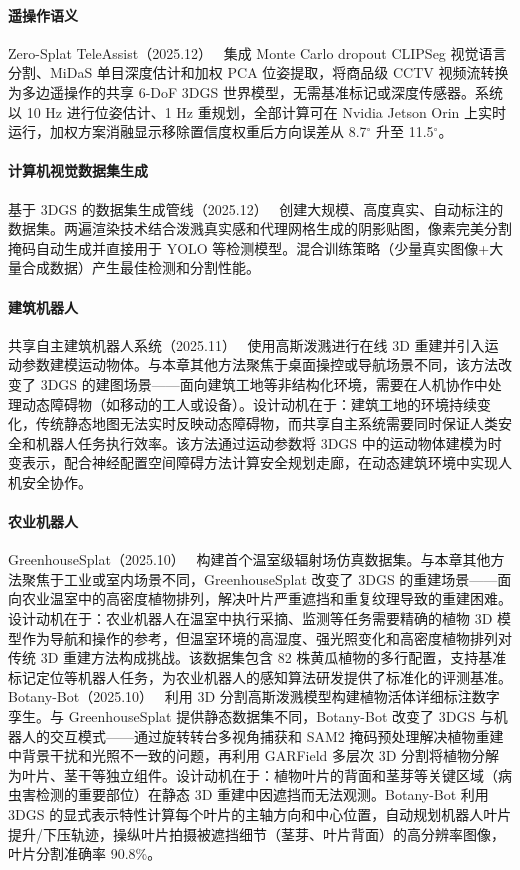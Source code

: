 \paragraph{遥操作语义}

Zero-Splat TeleAssist（2025.12）~\cite{2512_08271} 集成 Monte Carlo dropout CLIPSeg 视觉语言分割、MiDaS 单目深度估计和加权 PCA 位姿提取，将商品级 CCTV 视频流转换为多边遥操作的共享 6-DoF 3DGS 世界模型，无需基准标记或深度传感器。系统以 10 Hz 进行位姿估计、1 Hz 重规划，全部计算可在 Nvidia Jetson Orin 上实时运行，加权方案消融显示移除置信度权重后方向误差从 8.7$^\circ$ 升至 11.5$^\circ$。

\paragraph{计算机视觉数据集生成}

基于 3DGS 的数据集生成管线（2025.12）~\cite{2512_13411} 创建大规模、高度真实、自动标注的数据集。两遍渲染技术结合泼溅真实感和代理网格生成的阴影贴图，像素完美分割掩码自动生成并直接用于 YOLO 等检测模型。混合训练策略（少量真实图像+大量合成数据）产生最佳检测和分割性能。

\paragraph{建筑机器人}

共享自主建筑机器人系统（2025.11）~\cite{2511_09695} 使用高斯泼溅进行在线 3D 重建并引入运动参数建模运动物体。与本章其他方法聚焦于桌面操控或导航场景不同，该方法改变了 3DGS 的建图场景——面向建筑工地等非结构化环境，需要在人机协作中处理动态障碍物（如移动的工人或设备）。设计动机在于：建筑工地的环境持续变化，传统静态地图无法实时反映动态障碍物，而共享自主系统需要同时保证人类安全和机器人任务执行效率。该方法通过运动参数将 3DGS 中的运动物体建模为时变表示，配合神经配置空间障碍方法计算安全规划走廊，在动态建筑环境中实现人机安全协作。

\paragraph{农业机器人}

GreenhouseSplat（2025.10）~\cite{2510_01848} 构建首个温室级辐射场仿真数据集。与本章其他方法聚焦于工业或室内场景不同，GreenhouseSplat 改变了 3DGS 的重建场景——面向农业温室中的高密度植物排列，解决叶片严重遮挡和重复纹理导致的重建困难。设计动机在于：农业机器人在温室中执行采摘、监测等任务需要精确的植物 3D 模型作为导航和操作的参考，但温室环境的高湿度、强光照变化和高密度植物排列对传统 3D 重建方法构成挑战。该数据集包含 82 株黄瓜植物的多行配置，支持基准标记定位等机器人任务，为农业机器人的感知算法研发提供了标准化的评测基准。Botany-Bot（2025.10）~\cite{2510_17783} 利用 3D 分割高斯泼溅模型构建植物活体详细标注数字孪生。与 GreenhouseSplat 提供静态数据集不同，Botany-Bot 改变了 3DGS 与机器人的交互模式——通过旋转转台多视角捕获和 SAM2 掩码预处理解决植物重建中背景干扰和光照不一致的问题，再利用 GARField 多层次 3D 分割将植物分解为叶片、茎干等独立组件。设计动机在于：植物叶片的背面和茎芽等关键区域（病虫害检测的重要部位）在静态 3D 重建中因遮挡而无法观测。Botany-Bot 利用 3DGS 的显式表示特性计算每个叶片的主轴方向和中心位置，自动规划机器人叶片提升/下压轨迹，操纵叶片拍摄被遮挡细节（茎芽、叶片背面）的高分辨率图像，叶片分割准确率 90.8\%。

